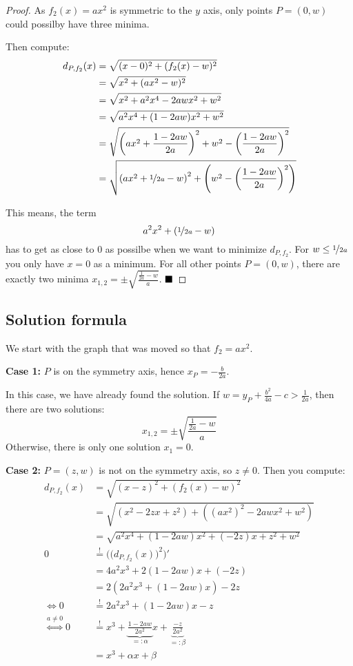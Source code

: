 \begin{proof}
As $f_2(x) = ax^2$ is symmetric to the $y$ axis, only points
$P = (0, w)$ could possilby have three minima.

Then compute:
\begin{align}
  d_{P,{f_2}}(x)  &= \sqrt{(x-0)^2 + (f_2(x)-w)^2}\\
    &= \sqrt{x^2 + (ax^2-w)^2}\\
    &= \sqrt{x^2 + a^2 x^4-2aw x^2+w^2}\\
    &= \sqrt{a^2 x^4 + (1-2aw) x^2 + w^2}\\
    &= \sqrt{\left (a x^2 + \frac{1-2 a w}{2a} \right )^2 + w^2 - \left (\frac{1-2 a w}{2a} \right )^2}\\
    &= \sqrt{\left (a x^2 + \nicefrac{1}{2a}- w \right )^2 + \left (w^2 - \left (\frac{1-2 a w}{2a} \right )^2 \right)}
\end{align}

This means, the term
\[a^2 x^2 + (\nicefrac{1}{2a}- w)\]
has to get as close to $0$ as possilbe when we want to minimize
$d_{P,{f_2}}$. For $w \leq \nicefrac{1}{2a}$ you only have $x = 0$ as a minimum.
For all other points $P = (0, w)$, there are exactly two minima $x_{1,2} = \pm \sqrt{\frac{\frac{1}{2a} - w}{a}}$.
$\qed$
\end{proof}

\subsection{Solution formula}
We start with the graph that was moved so that $f_2 = ax^2$.

\textbf{Case 1:} $P$ is on the symmetry axis, hence $x_P = - \frac{b}{2a}$.

In this case, we have already found the solution. If $w = y_P + \frac{b^2}{4a} - c > \frac{1}{2a}$,
then there are two solutions:
\[x_{1,2} = \pm \sqrt{\frac{\frac{1}{2a} - w}{a}}\]
Otherwise, there is only one solution $x_1 = 0$.

\textbf{Case 2:} $P = (z, w)$ is not on the symmetry axis, so $z \neq 0$. Then you compute:
\begin{align}
  d_{P,{f_2}}(x)  &= \sqrt{(x-z)^2 + (f_2(x)-w)^2}\\
    &= \sqrt{(x^2 - 2zx + z^2) + ((ax^2)^2 - 2 awx^2 + w^2)}\\
    &= \sqrt{a^2x^4 + (1- 2 aw)x^2 +(- 2z)x + z^2 + w^2}\\
  0 &\stackrel{!}{=} \Big(\big(d_{P, {f_2}}(x)\big)^2\Big)' \\
    &= 4a^2x^3 + 2(1- 2 aw)x +(- 2z)\\
    &= 2 \left (2a^2x^3 + (1- 2 aw)x \right ) - 2z\\
    \Leftrightarrow 0 &\stackrel{!}{=} 2a^2x^3  + (1- 2 aw) x - z\\
\stackrel{a \neq 0}{\Leftrightarrow} 0 &\stackrel{!}{=} x^3 + \underbrace{\frac{1- 2 aw}{2 a^2}}_{=: \alpha} x  + \underbrace{\frac{-z}{2 a^2}}_{=: \beta}\\
    &= x^3 + \alpha x + \beta\label{eq:simple-cubic-equation-for-quadratic-distance}
\end{align}

